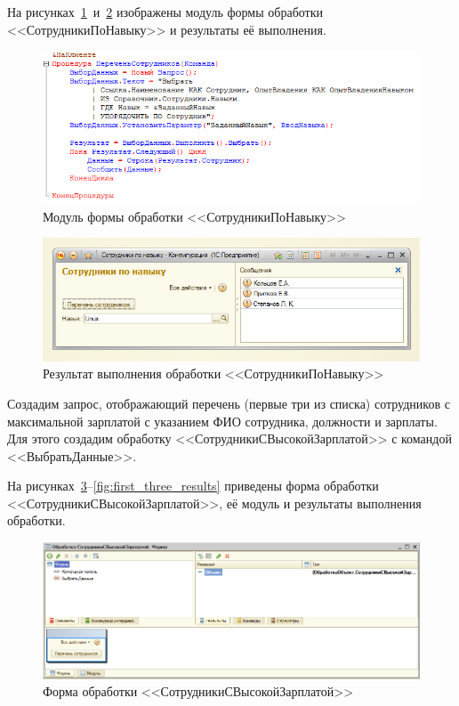 \pagebreak

На рисунках~\ref{fig:employees_by_skill_code}~и~\ref{fig:employees_by_skill_results}
изображены модуль формы обработки <<СотрудникиПоНавыку>> и результаты её выполнения.
\begin{figure}[h!]
  \centering
  \includegraphics[width=160mm]{pic/employees_by_skill_code}
  \caption{Модуль формы обработки <<СотрудникиПоНавыку>>}
  \label{fig:employees_by_skill_code}
\end{figure}

\begin{figure}[h!]
  \centering
  \includegraphics[width=160mm]{pic/employees_by_skill_results}
  \caption{Результат выполнения обработки <<СотрудникиПоНавыку>>}
  \label{fig:employees_by_skill_results}
\end{figure}



Создадим запрос, отображающий перечень (первые три из списка) сотрудников
с максимальной зарплатой с указанием ФИО сотрудника,
должности и зарплаты.
Для этого создадим обработку <<СотрудникиСВысокойЗарплатой>>
с командой <<ВыбратьДанные>>.

\pagebreak

На рисунках~\ref{fig:first_three_form}--\ref{fig:first_three_results} приведены
форма обработки <<СотрудникиСВысокойЗарплатой>>, её модуль и
результаты выполнения обработки.

\begin{figure}[h!]
  \centering
  \includegraphics[width=160mm]{pic/first_three_form}
  \caption{Форма обработки <<СотрудникиСВысокойЗарплатой>>}
  \label{fig:first_three_form}
\end{figure}


